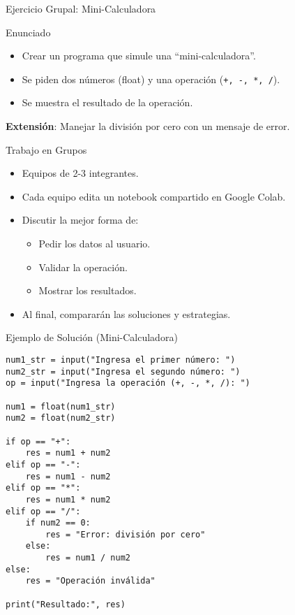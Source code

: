 \documentclass[10pt]{beamer}
\begin{document}
\begin{frame}{Ejercicio Grupal: Mini-Calculadora}
  \begin{block}{Enunciado}
    \begin{itemize}
      \item Crear un programa que simule una “mini-calculadora”.
      \item Se piden dos números (float) y una operación (\texttt{+, -, *, /}).
      \item Se muestra el resultado de la operación.
    \end{itemize}
  \end{block}
  \textbf{Extensión}: Manejar la división por cero con un mensaje de error.
\end{frame}

\begin{frame}{Trabajo en Grupos}
  \begin{itemize}
    \item Equipos de 2-3 integrantes.
    \item Cada equipo edita un notebook compartido en Google Colab.
    \item Discutir la mejor forma de:
      \begin{itemize}
        \item Pedir los datos al usuario.
        \item Validar la operación.
        \item Mostrar los resultados.
      \end{itemize}
    \item Al final, compararán las soluciones y estrategias.
  \end{itemize}
\end{frame}

\begin{frame}[fragile]{Ejemplo de Solución (Mini-Calculadora)}
\begin{verbatim}
num1_str = input("Ingresa el primer número: ")
num2_str = input("Ingresa el segundo número: ")
op = input("Ingresa la operación (+, -, *, /): ")

num1 = float(num1_str)
num2 = float(num2_str)

if op == "+":
    res = num1 + num2
elif op == "-":
    res = num1 - num2
elif op == "*":
    res = num1 * num2
elif op == "/":
    if num2 == 0:
        res = "Error: división por cero"
    else:
        res = num1 / num2
else:
    res = "Operación inválida"

print("Resultado:", res)
\end{verbatim}
\end{frame}
\end{document}
